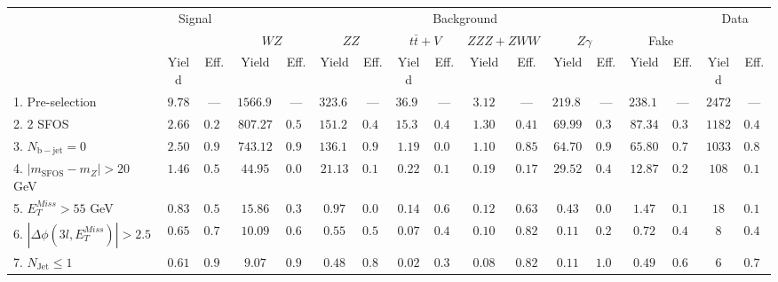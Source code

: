 \begin{tabular}{l||c|c||c|c||c|c||c|c||c|c||c|c||c|c||c|c}
\hline
 &                 \multicolumn{2}{c||}{Signal}            &  \multicolumn{12}{c||}{Background} &  \multicolumn{2}{c}{Data} \\
 & &  & \multicolumn{2}{c||}{$WZ$} & \multicolumn{2}{c||}{$ZZ$} & \multicolumn{2}{c||}{$t\bar{t}+V$} & \multicolumn{2}{c||}{$ZZZ+ZWW$} & \multicolumn{2}{c||}{$Z\gamma$} & \multicolumn{2}{c||}{Fake} &  & \\ 
 & Yield & Eff. & Yield & Eff. & Yield & Eff. & Yield & Eff. & Yield & Eff. & Yield & Eff. & Yield & Eff.  & Yield & Eff.\\
\hline\hline
1. Pre-selection &  $9.78$ & --- &  $1566.91$ & --- &  $323.60$ & --- &  $36.93$ & --- &  $3.12$ & --- &  $219.80$ & --- &  $238.12$ & ---  & $2472$ &  --- \\ 
\hline
2. 2 SFOS &  $2.66$ &  $0.27$ &  $807.27$ &  $0.52$ &  $151.28$ &  $0.47$ &  $15.35$ &  $0.42$ &  $1.30$ &  $0.41$ &  $69.99$ &  $0.32$ &  $87.34$ &  $0.37$ & $1182$ &  $0.48$\\ 
\hline
3. $N_{\mathrm{b-jet}}=0$ &  $2.50$ &  $0.94$ &  $743.12$ &  $0.92$ &  $136.16$ &  $0.90$ &  $1.19$ &  $0.08$ &  $1.10$ &  $0.85$ &  $64.70$ &  $0.92$ &  $65.80$ &  $0.75$ & $1033$ &  $0.87$\\ 
\hline
4. $| m_{\mathrm{SFOS}} - m_Z | >  20$ GeV &  $1.46$ &  $0.58$ &  $44.95$ &  $0.06$ &  $21.13$ &  $0.16$ &  $0.22$ &  $0.18$ &  $0.19$ &  $0.17$ &  $29.52$ &  $0.46$ &  $12.87$ &  $0.20$ & $108$ &  $0.10$\\ 
\hline
5. $E_{T}^{Miss} > 55$ GeV &  $0.83$ &  $0.57$ &  $15.86$ &  $0.35$ &  $0.97$ &  $0.05$ &  $0.14$ &  $0.65$ &  $0.12$ &  $0.63$ &  $0.43$ &  $0.01$ &  $1.47$ &  $0.11$ & $18$ &  $0.17$\\ 
\hline
6. $|\Delta\phi(3l,E_{T}^{Miss})| > 2.5$ &  $0.65$ &  $0.78$ &  $10.09$ &  $0.64$ &  $0.55$ &  $0.57$ &  $0.07$ &  $0.49$ &  $0.10$ &  $0.82$ &  $0.11$ &  $0.25$ &  $0.72$ &  $0.49$ & $8$ &  $0.44$\\ 
\hline
7. $N_{\mathrm{Jet}} \leq 1$ &  $0.61$ &  $0.94$ &  $9.07$ &  $0.90$ &  $0.48$ &  $0.86$ &  $0.02$ &  $0.35$ &  $0.08$ &  $0.82$ &  $0.11$ &  $1.00$ &  $0.49$ &  $0.69$ & $6$ &  $0.75$\\ 
\hline
\end{tabular}

